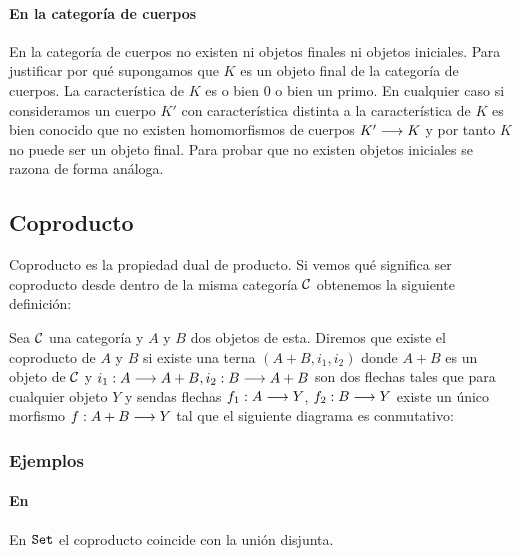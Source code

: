 \paragraph{En la categoría de cuerpos}
En la categoría de cuerpos no existen ni objetos finales ni objetos
iniciales. Para justificar por qué
supongamos que $K$ es un objeto final de la categoría
de cuerpos. La característica de $K$ es o bien 0 o bien un primo.
En cualquier caso si consideramos un cuerpo $K'$ con característica
distinta a la característica de $K$ es bien conocido que no existen
homomorfismos de cuerpos $K'\longrightarrow K$ y por tanto $K$ no
puede ser un objeto final. Para probar que no existen objetos iniciales
se razona de forma análoga.

\subsection{Coproducto}
Coproducto es la propiedad dual de producto. Si vemos qué significa
ser coproducto desde dentro de la misma categoría $\mathcal{C}$ obtenemos
la siguiente definición:

\begin{definition}
Sea $\mathcal{C}$ una categoría y $A$ y $B$ dos objetos de esta. Diremos que
existe el coproducto de $A$ y $B$
si existe una terna $(A+B, i_1, i_2)$
donde $A+B$ es un objeto de $\mathcal{C}$ y
$i_1 : A\longrightarrow A+B, i_2 : B\longrightarrow A+B$ son dos flechas tales
que para cualquier objeto $Y$ y sendas flechas $f_1 : A\longrightarrow Y$,
$f_2 : B\longrightarrow Y$ existe un único morfismo
$f : A+B\longrightarrow Y$ tal que el siguiente diagrama es conmutativo:
\begin{center}
\end{center}
\end{definition}

\subsubsection{Ejemplos}
\paragraph{En \Set}
En $\texttt{Set}$ el coproducto coincide con la unión disjunta.

